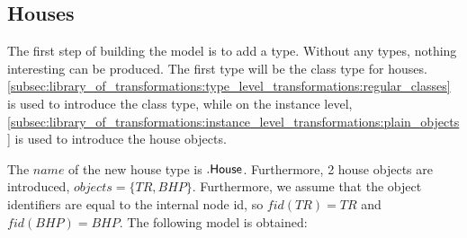 \subsection{Houses}
\label{subsec:application:building_the_model:houses}

The first step of building the model is to add a type. Without any types, nothing interesting can be produced. The first type will be the class type for houses. \cref{subsec:library_of_transformations:type_level_transformations:regular_classes} is used to introduce the class type, while on the instance level, \cref{subsec:library_of_transformations:instance_level_transformations:plain_objects} is used to introduce the house objects.

The $name$ of the new house type is $.\mathsf{House}$. Furthermore, 2 house objects are introduced, $objects = \{TR, BHP\}$. Furthermore, we assume that the object identifiers are equal to the internal node id, so $fid(TR) = TR$ and $fid(BHP) = BHP$. The following model is obtained:


